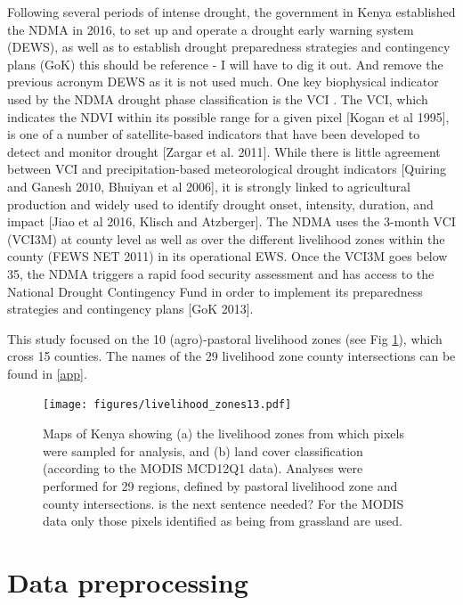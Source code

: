 \documentclass[review]{elsarticle}
\begin{document}
Following several periods of intense drought, the government in Kenya established the NDMA in 2016, to set up and operate a drought early warning system (DEWS), as well as to establish drought preparedness strategies and contingency plans (GoK){\color{green} this should be reference - I will have to dig it out. And remove the previous acronym DEWS as it is not used much}. One key biophysical indicator used by the NDMA drought phase classification is the VCI \citep{rs8040267}. {\color{blue} The VCI, which indicates the NDVI within its possible range for a given pixel [Kogan et al 1995], is one of a number of satellite-based indicators that have been developed to detect and monitor drought [Zargar et al. 2011]. While there is little agreement between VCI and precipitation-based meteorological drought indicators [Quiring and Ganesh 2010, Bhuiyan et al 2006], it is strongly linked to agricultural production and widely used to identify drought onset, intensity, duration, and impact [Jiao et al 2016, Klisch and Atzberger]. The NDMA uses the 3-month VCI (VCI3M) at county level as well as over the different livelihood zones within the county (FEWS NET 2011) in its operational EWS. Once the VCI3M goes below 35, the NDMA triggers a rapid food security assessment and has access to the National Drought Contingency Fund in order to implement its preparedness strategies and contingency plans [GoK 2013].} 

This study focused on the 10 (agro)-pastoral livelihood zones (see Fig \ref{fig:l_zone}), which cross 15 counties. The names of the 29 livelihood zone county intersections can be found in \ref{app}. 


\begin{figure}
	\centering
	\texttt{[image: figures/livelihood\_zones13.pdf]} 
	\caption{Maps of Kenya showing (a) the livelihood zones from which pixels were sampled for analysis, and (b) land cover classification (according to the MODIS MCD12Q1 data). Analyses were performed for 29 regions, defined by pastoral livelihood zone and county intersections. {\color{green} is the next sentence needed?} For the MODIS data only those pixels identified as being from grassland are used.} \label{fig:l_zone}
\end{figure}


\section{Data preprocessing} \label{sec:data}
\end{document}
